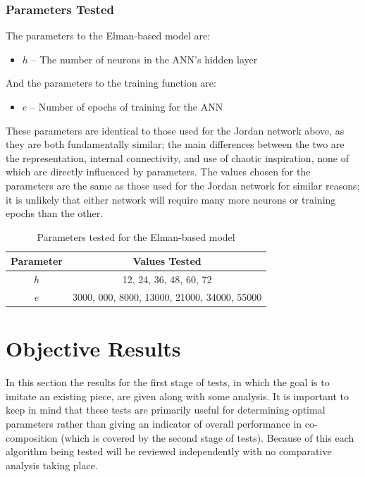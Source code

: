\documentclass[ author={Stephen Livermore-Tozer},
				supervisor={Dr. Peter Flach},
				degree={MEng},
				title={Algorithmic Co-composition Using Machine Learning},
				subtitle={},
				type={research},
				year={2016} ]{dissertation}
\begin{document}
	\subsubsection{Parameters Tested}
	
	The parameters to the Elman-based model are:
	\begin{itemize}
		\item $h$ -- The number of neurons in the ANN's hidden layer
	\end{itemize}
	And the parameters to the training function are:
	\begin{itemize}
		\item $e$ -- Number of epochs of training for the ANN
	\end{itemize}
	
	These parameters are identical to those used for the Jordan network above, as they are both fundamentally similar; the main differences between the two are the representation, internal connectivity, and use of chaotic inspiration, none of which are directly influenced by parameters. The values chosen for the parameters are the same as those used for the Jordan network for similar reasons; it is unlikely that either network will require many more neurons or training epochs than the other. 
	
	\begin{table}[h]
		\begin{center}
			\begin{tabular}{cc}
				\toprule
				Parameter & Values Tested\\
				\hline
				$h$ & 12, 24, 36, 48, 60, 72\\
				$e$ & 3000, 000, 8000, 13000, 21000, 34000, 55000\\
				\bottomrule
			\end{tabular}
		\end{center}
		\caption{Parameters tested for the Elman-based model}
		\label{tab:elman-parameters}
	\end{table}
	
	\section{Objective Results}

	In this section the results for the first stage of tests, in which the goal is to imitate an existing piece, are given along with some analysis. It is important to keep in mind that these tests are primarily useful for determining optimal parameters rather than giving an indicator of overall performance in co-composition (which is covered by the second stage of tests). Because of this each algorithm being tested will be reviewed independently with no comparative analysis taking place.
	
\end{document}
